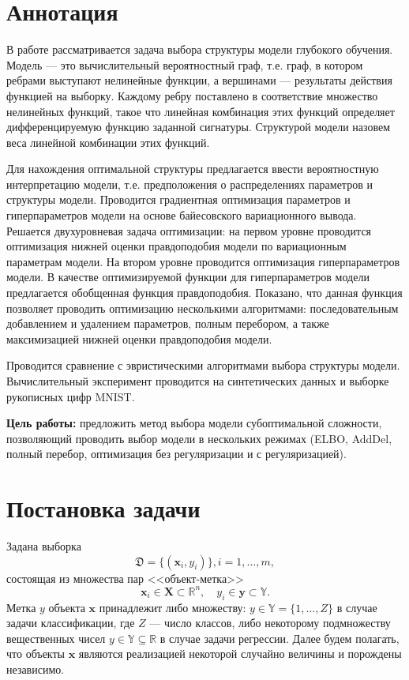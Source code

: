 \documentclass[12pt]{article}
\begin{document}
\section{Аннотация}
В работе рассматривается задача выбора структуры модели глубокого обучения.
Модель --- это вычислительный вероятностный граф, т.е. граф, в котором ребрами выступают нелинейные функции, а вершинами --- результаты действия функцией на выборку.  Каждому ребру поставлено в соответствие множество нелинейных функций, такое что линейная комбинация этих функций определяет дифференцируемую функцию заданной сигнатуры. Структурой модели назовем веса линейной комбинации этих функций. 

Для нахождения оптимальной структуры предлагается ввести вероятностную интерпретацию модели, т.е. предположения о распределениях параметров и структуры модели. 
Проводится градиентная оптимизация параметров и гиперпараметров модели на основе байесовского вариационного вывода. Решается двухуровневая задача оптимизации: на первом уровне проводится оптимизация нижней оценки правдоподобия модели по вариационным параметрам модели. На втором уровне проводится оптимизация гиперпараметров модели. В качестве оптимизируемой функции для гиперпараметров модели предлагается обобщенная функция правдоподобия. Показано, что данная функция позволяет проводить оптимизацию  несколькими алгоритмами: последовательным добавлением и удалением параметров, полным перебором, а также максимизацией нижней оценки правдоподобия модели.

Проводится сравнение с эвристическими алгоритмами выбора структуры модели. Вычислительный эксперимент проводится на синтетических данных и выборке рукописных цифр MNIST.

\textbf{Цель работы:} предложить метод выбора модели субоптимальной сложности, позволяющий проводить выбор модели в нескольких режимах (ELBO, AddDel, полный перебор, оптимизация без регуляризации и с регуляризацией).



\section{Постановка задачи}
Задана выборка \begin{equation}\label{eq:dataset}\mathfrak{D} = \{(\mathbf{x}_i,y_i)\}, i = 1,\dots,m,\end{equation} состоящая из множества пар <<объект-метка>> $$\mathbf{x}_i \in \mathbf{X} \subset \mathbb{R}^n, \quad {y}_i \in \mathbf{y} \subset \mathbb{Y}.$$ Метка ${y}$  объекта $\mathbf{x}$ принадлежит либо множеству: ${y} \in \mathbb{Y} = \{1, \dots, Z\}$ в случае задачи классификации, где $Z$ --- число классов, либо некоторому подмножеству вещественных чисел ${y} \in \mathbb{Y}  \subseteq \mathbb{R}$ в случае задачи регрессии. Далее будем полагать, что объекты $\mathbf{x}$ являются реализацией некоторой случайно величины и порождены независимо.
\end{document}

